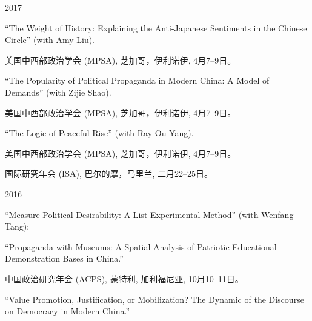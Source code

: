 \documentclass[10.5pt,]{article}
\providecommand{\tightlist}{%
  \setlength{\itemsep}{0pt}\setlength{\parskip}{0pt}}
\renewenvironment{itemize}{
  \begin{list}{}{
    \setlength{\leftmargin}{1.5em}
  }
}{
  \end{list}
}
\begin{document}
\begin{itemize}
\tightlist
\item
  2017

  \begin{itemize}
  \tightlist
  \item
    ``The Weight of History: Explaining the Anti-Japanese Sentiments in
    the Chinese Circle'' (with Amy Liu).

    \begin{itemize}
    \tightlist
    \item
      \footnotesize 美国中西部政治学会 (MPSA), 芝加哥，伊利诺伊,
      4月7--9日。
    \end{itemize}
  \item
    ``The Popularity of Political Propaganda in Modern China: A Model of
    Demands'' (with Zijie Shao).

    \begin{itemize}
    \tightlist
    \item
      \footnotesize 美国中西部政治学会 (MPSA), 芝加哥，伊利诺伊,
      4月7--9日。
    \end{itemize}
  \item
    ``The Logic of Peaceful Rise'' (with Ray Ou-Yang).

    \begin{itemize}
    \tightlist
    \item
      \footnotesize 美国中西部政治学会 (MPSA), 芝加哥，伊利诺伊,
      4月7--9日。
    \item
      \footnotesize 国际研究年会 (ISA), 巴尔的摩，马里兰, 二月22--25日。
    \end{itemize}
  \end{itemize}
\item
  2016

  \begin{itemize}
  \tightlist
  \item
    ``Measure Political Desirability: A List Experimental Method'' (with
    Wenfang Tang);
  \item
    ``Propaganda with Museums: A Spatial Analysis of Patriotic
    Educational Demonstration Bases in China.''

    \begin{itemize}
    \tightlist
    \item
      \footnotesize 中国政治研究年会 (ACPS), 蒙特利, 加利福尼亚,
      10月10--11日。
    \end{itemize}
  \item
    ``Value Promotion, Justification, or Mobilization? The Dynamic of
    the Discourse on Democracy in Modern China.''


\end{itemize}
\end{itemize}
\end{document}
